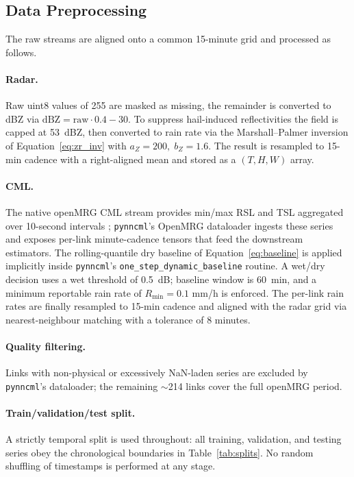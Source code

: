 \documentclass[12pt, a4paper]{article}
\begin{document}
\subsection{Data Preprocessing}\label{sec:preproc}

The raw streams are aligned onto a common 15-minute grid and processed
as follows.

\paragraph{Radar.} Raw uint8 values of 255 are masked as missing, the
remainder is converted to dBZ via \(\mathrm{dBZ} = \text{raw}\cdot 0.4
- 30\). To suppress hail-induced reflectivities the field is capped at
53~dBZ, then converted to rain rate via the Marshall--Palmer inversion
of Equation~\eqref{eq:zr_inv} with \(a_Z=200,\; b_Z=1.6\). The result
is resampled to 15-min cadence with a right-aligned mean and stored as
a \((T, H, W)\) array.

\paragraph{CML.} The native openMRG CML stream provides min/max RSL
and TSL aggregated over 10-second intervals
\cite{andersson2023openmrg}; \texttt{pynncml}'s OpenMRG dataloader
ingests these series and exposes per-link minute-cadence tensors that
feed the downstream estimators. The rolling-quantile dry baseline of
Equation~\eqref{eq:baseline} is applied implicitly inside
\texttt{pynncml}'s \texttt{one\_step\_dynamic\_baseline} routine. A
wet/dry decision uses a wet threshold of 0.5~dB; baseline window is
60~min, and a minimum reportable rain rate of \(R_{\min} = 0.1\) mm/h
is enforced. The per-link rain rates are finally resampled to 15-min
cadence and aligned with the radar grid via nearest-neighbour matching
with a tolerance of 8 minutes.

\paragraph{Quality filtering.} Links with non-physical or excessively
NaN-laden series are excluded by \texttt{pynncml}'s dataloader; the
remaining \(\sim\)214 links cover the full openMRG period.

\paragraph{Train/validation/test split.} A strictly temporal split is
used throughout: all training, validation, and testing series obey the
chronological boundaries in Table~\ref{tab:splits}. No random
shuffling of timestamps is performed at any stage.
\end{document}

